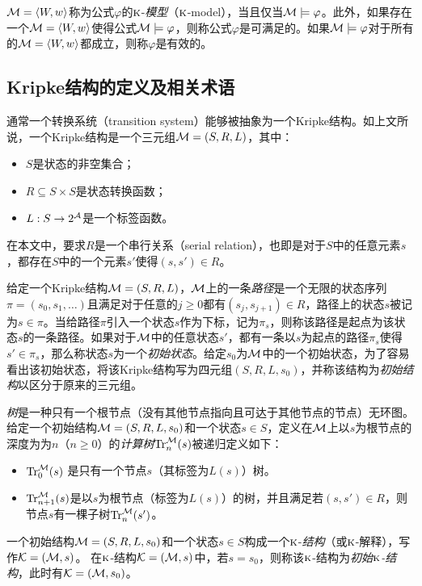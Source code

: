 ${\cal M}={\langle{W,w}\rangle}$称为公式$\varphi$的$\textsc{k}$-\emph{模型}（$\textsc{k}$-model），当且仅当${\cal M} \models \varphi$。此外，如果存在一个${\cal M}={\langle{W,w}\rangle}$使得公式${\cal M}\models \varphi$，则称公式$\varphi$是可满足的。如果${\cal M}\models \varphi$对于所有的${\cal M}={\langle{W,w}\rangle}$都成立，则称$\varphi$是有效的。


\subsection{Kripke结构的定义及相关术语}
通常一个转换系统（transition system）能够被抽象为一个Kripke结构\cite{Baier:PMC:2008}。如上文所说，一个Kripke结构是一个三元组${\cal M}=(S,R,L)$，其中：
\begin{itemize}
	\item $S$是状态的非空集合；
	\item $R \subseteq S \times S$是状态转换函数；
	\item $L:S\rightarrow 2^{{\cal A}}$是一个标签函数。
\end{itemize}
在本文中，要求$R$是一个串行关系（serial relation），也即是对于$S$中的任意元素$s$，都存在$S$中的一个元素$s'$使得$(s,s')\in R$。

给定一个Kripke结构${\cal M}=(S,R,L)$，${\cal M}$上的一条\emph{路径}是一个无限的状态序列$\pi=(s_0,s_1,\dots)$且满足对于任意的$j\ge 0$都有$(s_j,s_{j+1})\in R$，路径上的状态$s$被记为$s\in \pi$。当给路径$\pi$引入一个状态$s$作为下标，记为$\pi_s$，则称该路径是起点为该状态$s$的一条路径。如果对于${\cal M}$中的任意状态$s'$，都有一条以$s$为起点的路径$\pi_{s}$使得$s'\in \pi_{s}$，那么称状态$s$为一个\emph{初始状态}。给定$s_0$为${\cal M}$中的一个初始状态，为了容易看出该初始状态，将该Kripke结构写为四元组$(S,R,L,s_0)$，并称该结构为\emph{初始结构}以区分于原来的三元组。

\emph{树}是一种只有一个根节点（没有其他节点指向且可达于其他节点的节点）无环图。
给定一个初始结构${\cal M}=(S,R,L,s_0)$和一个状态$s\in S$，定义在${\cal M}$上以$s$为根节点的深度为为$n$（$n\ge 0$）的\emph{计算树}$\textrm{Tr}_n^{{\cal M}}(s)$被递归定义如下\cite{browne1988characterizing}：
\begin{itemize}
	\item $\textrm{Tr}_0^{{\cal M}}(s)$ 是只有一个节点$s$（其标签为$L(s)$）树。
	\item $\textrm{Tr}_{n+1}^{{\cal M}}(s)$是以$s$为根节点（标签为$L(s)$）的树，并且满足若$(s,s')\in R$，则节点$s$有一棵子树$\textrm{Tr}_{n}^{{\cal M}}(s')$。
\end{itemize}

一个初始结构${\cal M}=(S,R,L,s_0)$和一个状态$s\in S$构成一个$\textsc{k}$-\emph{结构}（或$\textsc{k}$-解释），写作${\cal K}=({\cal M},s)$。
在$\textsc{k}$-结构${\cal K}=({\cal M},s)$中，若$s=s_0$，则称该$\textsc{k}$-结构为\emph{初始$\textsc{k}$-结构}，此时有${\cal K}=({\cal M},s_0)$。



